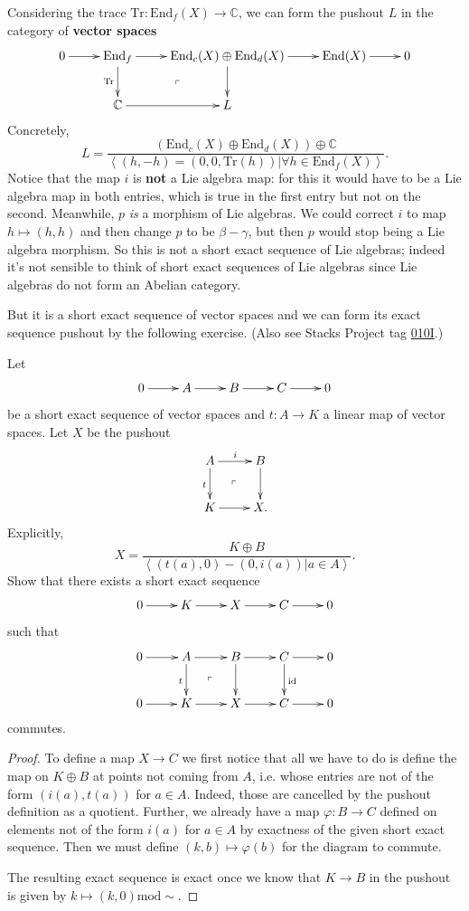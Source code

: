 \noindent
Considering the trace
$\text{Tr}:\text{End}_f(X) \to \mathbb{C}$,
we can form the pushout $L$ in the
category of
{\bf vector spaces}
$$
\xymatrix{
0\ar[r]&\text{End}_f\ar[r]\ar[d]_{\text{Tr}}
\ar@{}[dr]|-{\ulcorner}&
\text{End}_c(X) \oplus
\text{End}_d(X)\ar[d]\ar[r]&
\text{End}(X)\ar[r]&0\\
&\mathbb{C}\ar[r]& L
}
$$
Concretely,
$$
L=\frac{(\text{End}_c(X) \oplus
\text{End}_d(X))\oplus \mathbb{C}}
{\left\langle{}(h,-h)=(0,0,\text{Tr}(h))|
\forall  h \in \text{End}_f(X)\right\rangle{}}.
$$
Notice that the map $i$
is {\bf not} a Lie algebra map:
for this it would have to be a Lie algebra
map
in both entries, which is true in the first
entry
but not on the second.
Meanwhile, $p$ {\it is} a morphism of Lie
algebras.
We could correct $i$ to map $h\mapsto  (h,h)$
and then change $p$ to be $\beta-\gamma$,
but then $p$ would stop being a Lie algebra
morphism.
So this is not a short exact sequence of Lie
algebras;
indeed it's not sensible to think of
short exact sequences of Lie algebras
since Lie algebras do not form an Abelian
category.

But it is a short exact sequence of vector
spaces
and we can form its exact sequence pushout by
the following
exercise. (Also see Stacks Project tag
\href{https://stacks.math.columbia.edu/tag/%
010I}{010I}.)

\begin{exercise}
\label{exercise-pushout}
Let
$$
\xymatrix{
0\ar[r]&A\ar[r]&B\ar[r]&C\ar[r]&0
}
$$
be a short exact sequence of vector spaces
and $t:A \to K$ a linear map of vector
spaces.
Let $X$ be the pushout
$$
\xymatrix{
A\ar[r]^i\ar[d]_t\ar@{}[dr]|-{\ulcorner}&
B\ar[d]\\
K\ar[r]&X.
}
$$
Explicitly,
$$
X=\frac{K \oplus B}{\left\langle{}(t(a),0)-(0,i(a))|a
\in A\right\rangle{}}.
$$
Show that there exists a short exact sequence
 $$
\xymatrix{
0\ar[r]&K\ar[r]&X\ar[r]&C\ar[r]&0
}
$$
such that
$$
\xymatrix{
0\ar[r]&A\ar[r]\ar[d]_{t}\ar@{}[dr]|-
{\ulcorner}&
B\ar[d]\ar[r]&
C\ar[r]\ar[d]^{\text{id}}&0\\
0\ar[r]&K\ar[r]& X\ar[r]& C\ar[r]&0
}
$$
commutes.
\end{exercise}

\begin{proof}
To define a map $X \to C$ we first notice
that all we have to do is define the map on
$K \oplus B$ at points not coming from $A$,
i.e. whose entries are not of the form
$(i(a),t(a))$ for $a \in A$.
Indeed, those are cancelled by the pushout
definition
as a quotient. Further, we already have a map
$\varphi:B \to C$
defined on elements not of the form $i(a)$
for $a \in A$
by exactness of the given short exact
sequence.
Then we must define $(k,b) \mapsto
\varphi(b)$
for the diagram to commute.

The resulting exact sequence is exact once
we know that $K \to B$ in the pushout
is given by $k \mapsto (k,0) \text{mod
}\sim$.
\end{proof}

